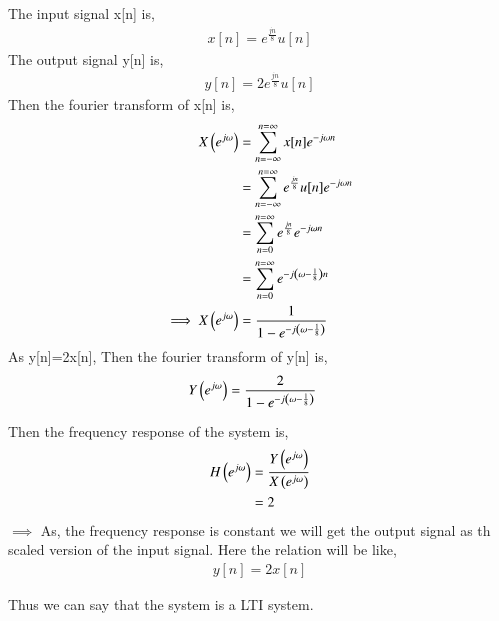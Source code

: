 \documentclass[journal,12pt,twocolumn]{IEEEtran}
\begin{document}
The input signal x[n] is,
\begin{align}
    x[n]=e^{\frac{jn}{8}}u[n]\label{0}
\end{align}
The output signal y[n] is,
\begin{align}
    y[n]=2e^{\frac{jn}{8}}u[n]\label{1}
\end{align}
Then the fourier transform of x[n] is,
\begin{align}
    X\left(e^{j\omega}\right)&=\sum\limits_{n=-\infty}^{n=\infty}x[n]e^{-j\omega n}\\
    &=\sum\limits_{n=-\infty}^{n=\infty}e^{\frac{jn}{8}}u[n]e^{-j\omega n}\\
    &=\sum\limits_{n=0}^{n=\infty}e^{\frac{jn}{8}}e^{-j\omega n}\\
    &=\sum\limits_{n=0}^{n=\infty}e^{-j\left(\omega-\frac{1}{8}\right) n}\\
    \implies X\left(e^{j\omega}\right)&=\frac{1}{1-e^{-j\left(\omega-\frac{1}{8}\right)}}
\end{align}
As y[n]=2x[n],
Then the fourier transform of y[n] is,
\begin{align}
    Y\left(e^{j\omega}\right)&=\frac{2}{1-e^{-j\left(\omega-\frac{1}{8}\right)}}
\end{align}

Then the frequency response of the system is,
\begin{align}
    H\left(e^{j\omega}\right)&=\frac{Y\left(e^{j\omega}\right)}{X\left(e^{j\omega}\right)}\\
    &=2
\end{align}
$\implies$ As, the frequency response is constant we will get the output signal as th scaled version of the input signal. Here the relation will be like,
\begin{align}
    y[n]=2x[n]
\end{align}

Thus we can say that the system is a LTI system. 
\end{document}
